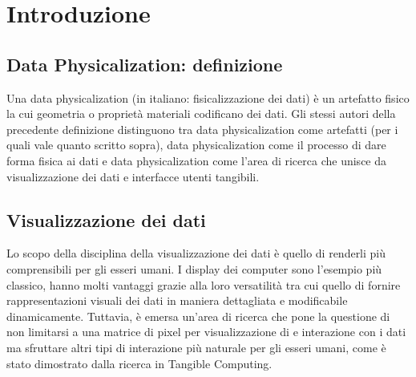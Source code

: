 \documentclass[12pt,a4paper]{report}
\begin{document}

\chapter{Introduzione}
\section{Data Physicalization: definizione}
Una data physicalization (in italiano: fisicalizzazione dei dati) è un artefatto fisico la cui geometria o proprietà materiali codificano dei dati.\cite{dataphysorg:terminology}
Gli stessi autori della precedente definizione distinguono tra data physicalization come artefatti (per i quali vale quanto scritto sopra),
data physicalization come il processo di dare forma fisica ai dati e data physicalization come l'area di ricerca che unisce da visualizzazione
dei dati e interfacce utenti tangibili.

\section{Visualizzazione dei dati}
Lo scopo della disciplina della visualizzazione dei dati è quello di renderli più comprensibili per gli esseri umani. I display dei computer
sono l'esempio più classico, hanno molti vantaggi grazie alla loro versatilità tra cui quello di fornire rappresentazioni visuali dei dati in
maniera dettagliata e modificabile dinamicamente. Tuttavia, è emersa un'area di ricerca che pone la questione di non limitarsi a una
matrice di pixel per visualizzazione di e interazione con i dati ma sfruttare altri tipi di interazione più naturale per gli esseri umani, come
è stato dimostrato dalla ricerca in Tangible Computing. \cite{hal:dataphys}
\end{document}
